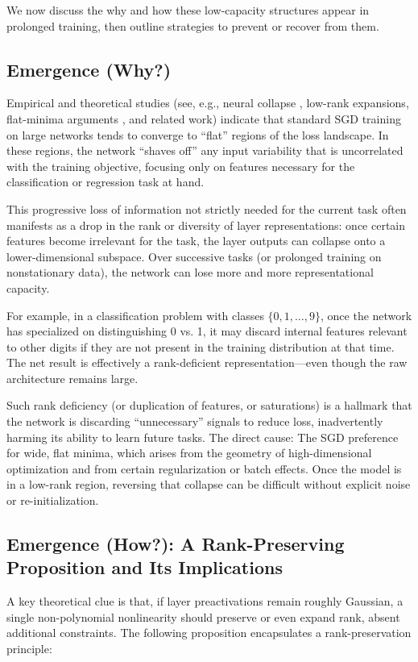 \documentclass[11pt]{article}
\begin{document}
We now discuss the why and how these low-capacity structures appear in prolonged training, then outline strategies to prevent or recover from them.

\subsection{Emergence (Why?)}
Empirical and theoretical studies (see, e.g., neural collapse \cite{Papyan2020neural}, low-rank expansions\cite{Arora2019finegrain}, flat-minima arguments \cite{Hochreiter1997flat, Keskar2017large}, and related work) indicate that standard SGD training on large networks tends to converge to ``flat'' regions of the loss landscape. In these regions, the network ``shaves off'' any input variability that is uncorrelated with the training objective, focusing only on features necessary for the classification or regression task at hand.

This progressive loss of information not strictly needed for the current task often manifests as a drop in the rank or diversity of layer representations: once certain features become irrelevant for the task, the layer outputs can collapse onto a lower-dimensional subspace. Over successive tasks (or prolonged training on nonstationary data), the network can lose more and more representational capacity.

For example, in a classification problem with classes $\{0,1,\dots,9\}$, once the network has specialized on distinguishing 0 vs. 1, it may discard internal features relevant to other digits if they are not present in the training distribution at that time. The net result is effectively a rank-deficient representation---even though the raw architecture remains large.

Such rank deficiency (or duplication of features, or saturations) is a hallmark that the network is discarding ``unnecessary'' signals to reduce loss, inadvertently harming its ability to learn future tasks. The direct cause: The SGD preference for wide, flat minima, which arises from the geometry of high-dimensional optimization \cite{Hochreiter1997flat, Chaudhari2019entropy} and from certain regularization or batch effects. Once the model is in a low-rank region, reversing that collapse can be difficult without explicit noise or re-initialization.

\subsection{Emergence (How?): A Rank-Preserving Proposition and Its Implications}
A key theoretical clue is that, if layer preactivations remain roughly Gaussian, a single non-polynomial nonlinearity should preserve or even expand rank, absent additional constraints. The following proposition encapsulates a rank-preservation principle:
\end{document}

